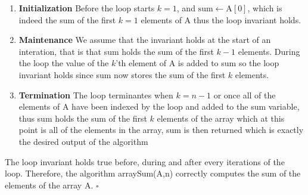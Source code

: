 \documentclass{article}
\begin{document}
\begin{enumerate}[label=\roman*.]
  \item \textbf{Initialization}\newline
        Before the loop starts $k=1$, and $\text{sum}\leftarrow \text{A}[0]$, which is indeed the sum of the first $k=1$ elements of A thus the loop invariant holds.
  \item \textbf{Maintenance}\newline
        We assume that the invariant holds at the start of an interation, that is that sum holds the sum of the first $k-1$ elements. During the loop the value of the $k$'th element of A is added to sum so the loop invariant holds since sum now stores the sum of the first $k$ elements.
  \item \textbf{Termination}\newline    
        The loop terminantes when $k=n-1$ or once all of the elements of A have been indexed by the loop and added to the sum variable, thus sum holds the sum of the first $k$ elements of the array which at this point is all of the elements in the array, sum is then returned which is exactly the desired output of the algorithm
\end{enumerate}
The loop invariant holds true before, during and after every iterations of the loop. Therefore, the algorithm arraySum(A,n) correctly computes the sum of the elements of the array A. $\square$
\end{document}
